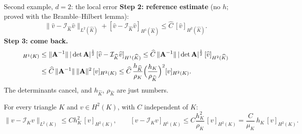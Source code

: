 \begin{frame}{Second example, $d = 2$: the local error}
    \small
    \textbf{Step 2: reference estimate} (no $h$; proved with the Bramble--Hilbert lemma):
    \[
        \|\widehat v - \mathcal I_{\widehat K}\widehat v\|_{L^2(\widehat K)} + [\widehat v - \mathcal I_{\widehat K}\widehat v]_{H^1(\widehat K)} \le \widehat C\, [\widehat v]_{H^2(\widehat K)} .
    \]
    \textbf{Step 3: come back.}
    \begin{align*}
        [v - \mathcal I_K v]_{H^1(K)}
         & \le \|\mat A^{-1}\|\, |\det\mat A|^{\frac12}\, [\widehat v - \mathcal I_{\widehat K}\widehat v]_{H^1(\widehat K)}
        \le \widehat C\, \|\mat A^{-1}\|\, |\det\mat A|^{\frac12}\, [\widehat v]_{H^2(\widehat K)}                           \\
         & \le \widehat C\, \|\mat A^{-1}\|\, \|\mat A\|^2\, [v]_{H^2(K)}
        \le \widehat C\, \frac{h_{\widehat K}}{\rho_K} \Big(\frac{h_K}{\rho_{\widehat K}}\Big)^2 [v]_{H^2(K)} .
    \end{align*}
    The determinants cancel, and $h_{\widehat K}$, $\rho_{\widehat K}$ are just numbers.
    \begin{theorem}
        For every triangle $K$ and $v \in H^2(K)$, with $C$ independent of $K$:
        \[
            \|v - \mathcal I_K v\|_{L^2(K)} \le C h_K^2\, [v]_{H^2(K)},
            \qquad
            [v - \mathcal I_K v]_{H^1(K)} \le C \frac{h_K^2}{\rho_K}\, [v]_{H^2(K)} = \frac{C}{\mu_K}\, h_K\, [v]_{H^2(K)} .
        \]
    \end{theorem}
\end{frame}

